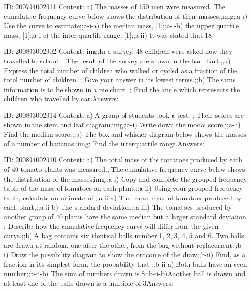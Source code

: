 \documentclass{article}
\begin{document}
ID: 200704002011
Content:
a) The masses of 150 men were measured. The cumulative frequency curve below shows the distribution of their masses.;img;;a-i) Use the curve to estimate;;a-i-a) the median mass, [1];;a-i-b) the upper quartile mass, [1];;a-i-c) the inter-quartile range. [1];;a-ii) It was stated that 18%

ID: 200803002002
Content:
img;In a survey, 48 children were asked how they travelled to school. ; The result of the survey are shown in the bar chart.;;a) Express the total number of children who walked or cycled as a fraction of the total number of children. ; Give your answer in its lowest terms.;;b) The same information is to be shown in a pie chart. ; Find the angle which represents the children who travelled by car.Answers:

ID: 200803002014
Content:
a) A group of students took a test. ; Their scores are shown in the stem and leaf diagram;img;;a-i) Write down the modal score.;;a-ii) Find the median score.;;b) The box and whisker diagram below shows the masses of a number of bananas.;img; Find the interquartile range.Answers:

ID: 200804002010
Content:
a) The total mass of the tomatoes produced by each of 40 tomato plants was measured.; The cumulative frequency curve below shows the distribution of the masses;img;;a-i) Copy and complete the grouped frequency table of the mass of tomatoes on each plant.;;a-ii) Using your grouped frequency table, calculate an estimate of ;;a-ii-a) The mean mass of tomatoes produced by each plant,;;a-ii-b) The standard deviation.;;a-iii) The tomatoes produced by another group of 40 plants have the same median but a larger standard deviation ; Describe how the cumulative frequency curve will differ from the given curve.;;b) A bag contains six identical balls number 1, 2, 3, 4, 5 and 6. Two balls are drawn at random, one after the other, from the bag without replacement.;;b-i) Draw the possibility diagram to show the outcome of the draw;;b-ii) Find, as a fraction in its simplest form, the probability that ;;b-ii-a) Both balls have an even number;;b-ii-b) The sum of numbers drawn is 8;;b-ii-b)Another ball is drawn and at least one of the balls drawn is a multiple of 3Answers:
\end{document}
